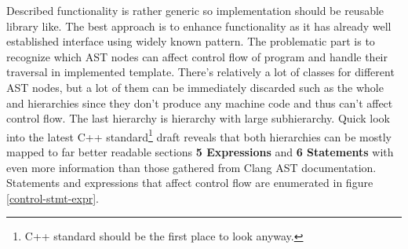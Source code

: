 Described functionality is rather generic so implementation should be reusable library like. The best approach is to enhance  functionality as it has already well established interface using widely known pattern. The problematic part is to recognize which AST nodes can affect control flow of program and handle their traversal in implemented template. There's relatively a lot of classes for different AST nodes, but a lot of them can be immediately discarded such as the whole  and  hierarchies since they don't produce any machine code and thus can't affect control flow. The last hierarchy is  hierarchy with large  subhierarchy. Quick look into the latest C++ standard\footnote{C++ standard should be the first place to look anyway.} draft reveals that both hierarchies can be mostly mapped to far better readable sections \textbf{5 Expressions} and \textbf{6 Statements} with even more information than those gathered from Clang AST documentation. Statements and expressions that affect control flow are enumerated in figure \ref{control-stmt-expr}.


